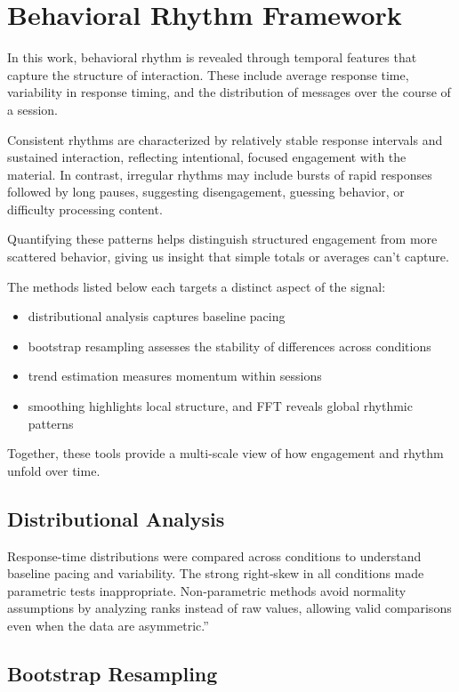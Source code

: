 \documentclass[10pt]{article}
\begin{document}
\section{Behavioral Rhythm Framework}

In this work, behavioral rhythm is revealed through temporal features that capture the structure of interaction. These include average response time, variability in response timing, and the distribution of messages over the course of a session.

Consistent rhythms are characterized by relatively stable response intervals and sustained interaction, reflecting intentional, focused engagement with the material. In contrast, irregular rhythms may include bursts of rapid responses followed by long pauses, suggesting disengagement, guessing behavior, or difficulty processing content.

Quantifying these patterns helps distinguish structured engagement from more scattered behavior, giving us insight that simple totals or averages can’t capture.

The methods listed below each targets a distinct aspect of the signal: 
\begin{itemize}
    \item distributional analysis captures baseline pacing
    \item bootstrap resampling assesses the 
stability of differences across conditions
    \item trend estimation measures momentum within 
sessions
   \item smoothing highlights local structure, and FFT reveals global rhythmic patterns
\end{itemize}
Together, these tools provide a multi-scale view of how engagement and rhythm unfold over time.


\subsection{Distributional Analysis}

Response-time distributions were compared across conditions to understand baseline pacing and variability. The strong right‑skew in all conditions made parametric tests inappropriate. Non‑parametric methods avoid normality assumptions by analyzing ranks instead of raw values, allowing valid comparisons even when the data are asymmetric.”

\subsection{Bootstrap Resampling}
\end{document}
